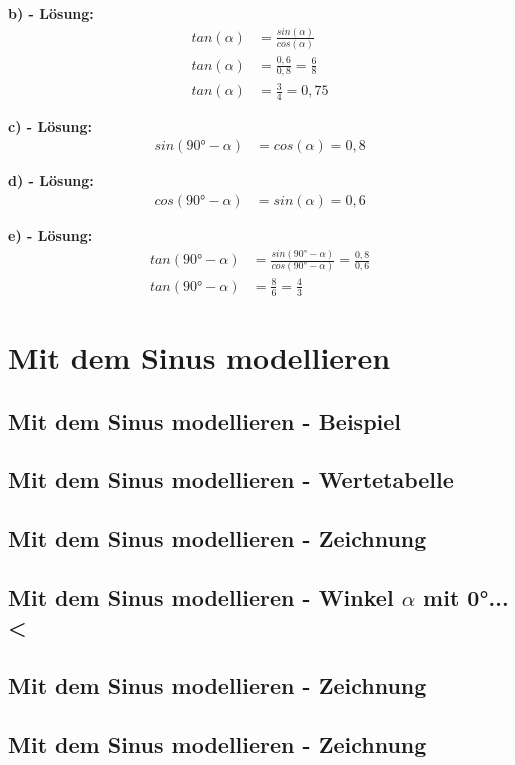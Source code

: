 \documentclass[12pt,a4paper]{article}
\begin{document}
\textbf{b) - Lösung:}
\begin{align}
	tan(\alpha) &= \frac{sin(\alpha)}{cos(\alpha)} \tag{1} \\
	tan(\alpha) &= \frac{0,6}{0,8} = \frac{6}{8} \tag{2} \\
	tan(\alpha) &= \frac{3}{4} = 0,75 \tag{3}
\end{align}

\textbf{c) - Lösung:}
\begin{align}
	sin(90° - \alpha) &= cos(\alpha) = 0,8 \tag{1}
\end{align}

\textbf{d) - Lösung:}
\begin{align}
	cos(90° - \alpha) &= sin(\alpha) = 0,6 \tag{1}
\end{align}

\textbf{e) - Lösung:}
\begin{align}
	tan(90° - \alpha) &= \frac{sin(90° - \alpha)}{cos(90° - \alpha)} = \frac{0,8}{0,6} \tag{1} \\
	tan(90° - \alpha) &= \frac{8}{6} = \frac{4}{3} \tag{2}
\end{align}

\newpage
\section{Mit dem Sinus modellieren}
\subsection{Mit dem Sinus modellieren - Beispiel}
\subsection{Mit dem Sinus modellieren - Wertetabelle}
\subsection{Mit dem Sinus modellieren - Zeichnung}

\subsection{Mit dem Sinus modellieren - Winkel $\alpha$ mit 0°...<}
\subsection{Mit dem Sinus modellieren - Zeichnung}
\subsection{Mit dem Sinus modellieren - Zeichnung}
\end{document}

